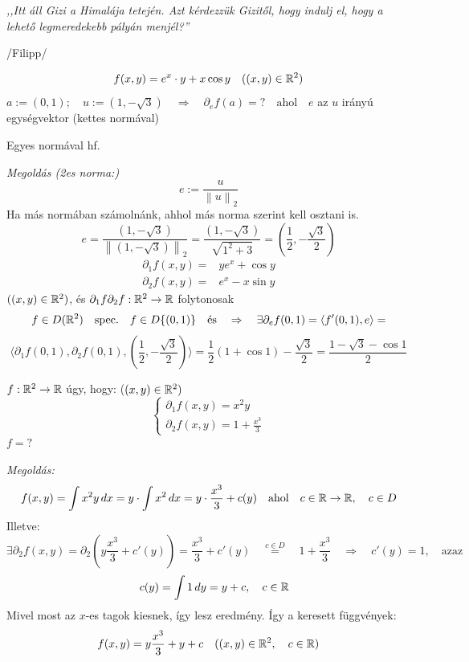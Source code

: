 \documentclass[a4paper,11.5pt]{article}
\newcommand{\norm}[1]{\left\lVert#1\right\rVert}
\begin{document}
	\begin{center}
		\textit{,,Itt áll Gizi a Himalája tetején. Azt kérdezzük Gizitől, hogy indulj el, hogy a lehető legmeredekebb pályán menjél?''}
		
		/Filipp/
	\end{center}
	\begin{task}
		\[ f(x,y)=e^x\cdot y+x\cos y\quad ((x,y)\in\mathbb{R}^2) \]
		$a:=(0,1);\quad u:=(1,-\sqrt{3})\quad \Rightarrow\quad \partial_ef(a)=?\quad \text{ahol}\quad e$ az $u$ irányú egységvektor (kettes normával)
		
		Egyes normával hf.
		
		\textit{Megoldás (2es norma:)} 
		\[ e:=\frac{u}{\norm{u}_2} \]
		Ha más normában számolnánk, ahhol más norma szerint kell osztani is.
		\[ e=\frac{(1,-\sqrt{3})}{\norm{(1,-\sqrt{3})}_2}=\frac{(1,-\sqrt{3})}{ \sqrt{1^2+3}}=\left(\frac{1}{2},-\frac{\sqrt{3}}{2}\right) \]
		\begin{align*}
			\partial_1f(x,y)=&ye^x+\cos y\\
			\partial_2f(x,y)=&e^x-x\sin y
		\end{align*}
		$((x,y)\in\mathbb{R}^2)$, és $\partial_1f\partial_2f:\mathbb{R}^2\to\mathbb{R}$ folytonosak
		\[ f\in D(\mathbb{R}^2)\quad \text{spec.}\quad f\in D\{(0,1)\}\quad \text{és}\quad \Rightarrow\quad \exists\partial_ef(0,1)=\langle f'(0,1),e\rangle=\]
		\[\Big\langle \partial_1f(0,1),\partial_2f(0,1),\left(\frac{1}{2},-\frac{\sqrt{3}}{2}\right)\Big\rangle=\frac{1}{2}(1+\cos 1)-\frac{\sqrt{3}}{2}=\frac{1-\sqrt{3}-\cos1}{2} \]
	\end{task}
	\begin{task}$f:\mathbb{R}^2\to\mathbb{R}$ úgy, hogy: \quad ($(x,y)\in\mathbb{R}^2)$
		\[ \begin{cases}
			\partial_1f(x,y)=x^2y\\
			\partial_2f(x,y)=1+\frac{x^3}{3}
		\end{cases} \]
		$f=?$
		
		\textit{Megoldás:} 
		\[f(x,y)=\int x^2y\,dx =y\cdot\int x^2\,dx=y\cdot\frac{x^3}{3}+c(y)\quad \text{ahol}\quad c\in\mathbb{R}\to\mathbb{R},\quad c\in D \]
		Illetve:
		\[ \exists\partial_2f(x,y)=\partial_2\left(y\frac{x^3}{3}+c'(y)\right)=\frac{x^3}{3}+c'(y)\quad \overset{c\in D}{=}\quad 1+\frac{x^3}{3}\quad \Rightarrow\quad c'(y)=1, \quad \text{azaz}\]
		\[\quad c(y)=\int1\,dy=y+c, \quad c\in\mathbb{R} \]
		Mivel most az $x$-es tagok kiesnek, így lesz eredmény. 
		Így a keresett függvények:
		\[ f(x,y)=y\frac{x^3}{3}+y+c\quad ((x,y)\in\mathbb{R}^2,\quad c\in\mathbb{R}) \]
	\end{task}
\end{document}

